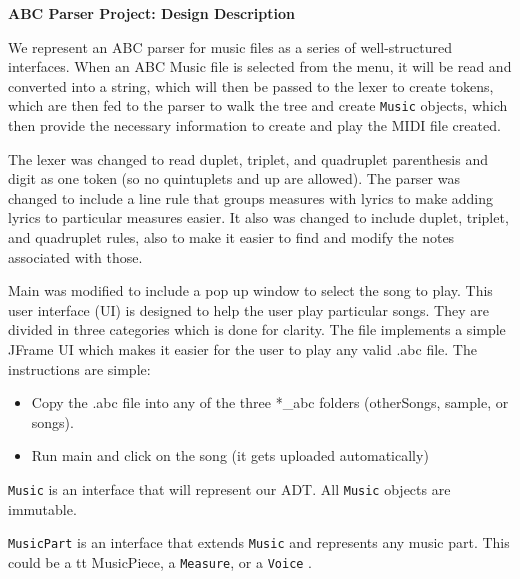 \documentclass[12pt]{book}
\begin{document}
\phantom{xxx}
\bigskip
\centerline{{\large \bf ABC Parser Project: Design Description }}
\bigskip\bigskip


We represent an ABC parser for music files as a series of well-structured interfaces. When an ABC Music file is selected from the menu, it will be read and converted into a string, which will then be passed to the lexer to create tokens, which are then fed to the parser to walk the tree and create {\tt Music} objects, which then provide the necessary information to create and play the MIDI file created.

\bigskip
{}
\bigskip

The lexer was changed to read duplet, triplet, and quadruplet parenthesis and digit as one token (so no quintuplets and up are allowed). The parser was changed to include a line rule that groups measures with lyrics to make adding lyrics to particular measures easier. It also was changed to include duplet, triplet, and quadruplet rules, also to make it easier to find and modify the notes associated with those.

Main was modified to include a pop up window to select the song to play. This user interface (UI) is designed to help the user play particular songs. They are divided in three categories which is done for clarity. 
The file implements a simple JFrame UI which makes it easier for the user to play any valid .abc file. The instructions are simple:

\begin{itemize}
\item Copy the .abc file into any of the three *\_abc folders (otherSongs, sample, or songs).
\item Run main and click on the song (it gets uploaded automatically)
\end{itemize}


\bigskip
 {\tt Music} is an interface that will represent our ADT. All {\tt Music} objects are immutable. 

 {\tt MusicPart} is an interface that extends {\tt Music} and represents any music part. This could be a {tt MusicPiece}, a {\tt Measure}, or a {\tt Voice} . 
\end{document}
